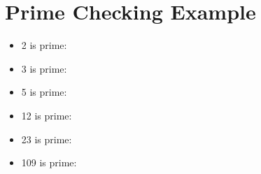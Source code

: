 \documentclass{article}
\begin{document}
\section{Prime Checking Example}
\begin{itemize}
    \item 2 is prime: \textbf{}
    \item 3 is prime: \textbf{}
    \item 5 is prime: \textbf{}
    \item 12 is prime: \textbf{}
    \item 23 is prime: \textbf{}
    \item 109 is prime: \textbf{}
\end{itemize}
\end{document}
